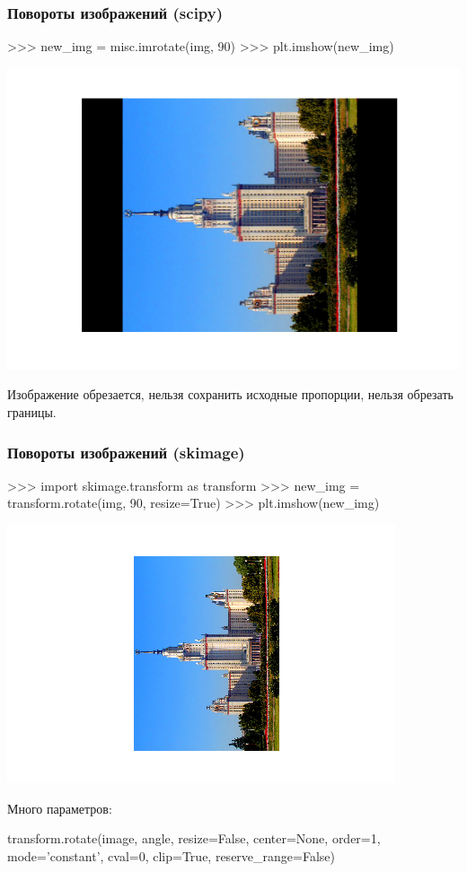 \documentclass[fleqn, xcolor=x11names]{beamer}
\begin{document}
\begin{frame}[fragile]\frametitle{Повороты изображений (scipy)}
\begin{pcode}
>>> new_img = misc.imrotate(img, 90)
>>> plt.imshow(new_img)
\end{pcode}
\includegraphics[scale=0.4]{images/img_rot_scipy.png}

Изображение обрезается, нельзя сохранить исходные пропорции, нельзя обрезать границы.

\end{frame}

\begin{frame}[fragile]\frametitle{Повороты изображений (skimage)}
\begin{pcode}
>>> import skimage.transform as transform
>>> new_img = transform.rotate(img, 90, resize=True)
>>> plt.imshow(new_img)
\end{pcode}
\includegraphics[scale=0.45]{images/img_rot_skimage.png}

Много параметров:
\begin{pcode}
transform.rotate(image, angle, resize=False, center=None, 
order=1, mode='constant', cval=0, clip=True,
reserve_range=False)
\end{pcode}

\end{frame}
\end{document}
